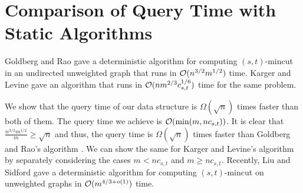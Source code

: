 

\section{Comparison of Query Time with Static Algorithms}
\label{appendix:non-trivial-query-time}
Goldberg and Rao \cite{DBLP:conf/focs/GoldbergR97a} gave a deterministic algorithm for computing $(s,t)$-mincut in an undirected unweighted graph that runs in ${\cal O}(n^{3/2}m^{1/2})$ time. Karger and Levine \cite{DBLP:conf/stoc/KargerL98} gave an algorithm that runs in ${\cal O}(nm^{2/3}c_{s,t}^{1/6})$ time for the same problem. 

We show that the query time of our data structure is ${\Omega}(\sqrt{n})$ times faster than both of them. The query time we achieve is ${\cal O}(\min(m,nc_{s,t}))$.
It is clear that $\frac{n^{3/2}m^{1/2}}{m}\geq \sqrt{n}$ and thus, the query time is $\Omega(\sqrt{n})$ times faster than Goldberg and Rao's algorithm \cite{DBLP:conf/focs/GoldbergR97a}. We can show the same for Karger and Levine's algorithm \cite{DBLP:conf/stoc/KargerL98} by separately considering the cases $m<nc_{s,t}$ and $m\geq nc_{s,t}$. Recently, Liu and Sidford \cite{DBLP:journals/corr/abs-2003-08929} gave a deterministic algorithm for computing $(s,t)$-mincut on unweighted graphs in ${\cal O}(m^{4/3 + o(1)})$ time.

